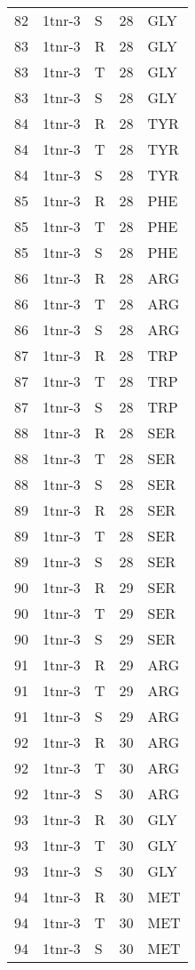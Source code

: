 \begin{longtable}[l]{l|l|l|l|l}
	82 & 1tnr-3 & S & 28 & GLY \\
	83 & 1tnr-3 & R & 28 & GLY \\
	83 & 1tnr-3 & T & 28 & GLY \\
	83 & 1tnr-3 & S & 28 & GLY \\
	84 & 1tnr-3 & R & 28 & TYR \\
	84 & 1tnr-3 & T & 28 & TYR \\
	84 & 1tnr-3 & S & 28 & TYR \\
	85 & 1tnr-3 & R & 28 & PHE \\
	85 & 1tnr-3 & T & 28 & PHE \\
	85 & 1tnr-3 & S & 28 & PHE \\
	86 & 1tnr-3 & R & 28 & ARG \\
	86 & 1tnr-3 & T & 28 & ARG \\
	86 & 1tnr-3 & S & 28 & ARG \\
	87 & 1tnr-3 & R & 28 & TRP \\
	87 & 1tnr-3 & T & 28 & TRP \\
	87 & 1tnr-3 & S & 28 & TRP \\
	88 & 1tnr-3 & R & 28 & SER \\
	88 & 1tnr-3 & T & 28 & SER \\
	88 & 1tnr-3 & S & 28 & SER \\
	89 & 1tnr-3 & R & 28 & SER \\
	89 & 1tnr-3 & T & 28 & SER \\
	89 & 1tnr-3 & S & 28 & SER \\
	90 & 1tnr-3 & R & 29 & SER \\
	90 & 1tnr-3 & T & 29 & SER \\
	90 & 1tnr-3 & S & 29 & SER \\
	91 & 1tnr-3 & R & 29 & ARG \\
	91 & 1tnr-3 & T & 29 & ARG \\
	91 & 1tnr-3 & S & 29 & ARG \\
	92 & 1tnr-3 & R & 30 & ARG \\
	92 & 1tnr-3 & T & 30 & ARG \\
	92 & 1tnr-3 & S & 30 & ARG \\
	93 & 1tnr-3 & R & 30 & GLY \\
	93 & 1tnr-3 & T & 30 & GLY \\
	93 & 1tnr-3 & S & 30 & GLY \\
	94 & 1tnr-3 & R & 30 & MET \\
	94 & 1tnr-3 & T & 30 & MET \\
	94 & 1tnr-3 & S & 30 & MET \\

\end{longtable}
